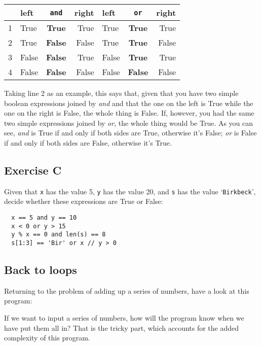 \vspace{1em}
\begin{tabular}{|l|lcr||lcr|}
\hline
& left & \verb!and! & right & left & \verb+or+ & right\\
\hline
\hline
1 & True & \textbf{True} & True&True&\textbf{True}&True\\
2 & True & \textbf{False} & False&True&\textbf{True}&False\\
3 & False & \textbf{False} & True&False&\textbf{True}&True\\
4 & False & \textbf{False} & False&False&\textbf{False}&False\\
\hline
\end{tabular}
\vspace{1em}

Taking line 2 as an example, this says that, given that you have two simple
boolean expressions joined by \emph{and} and that the one on the left is
True while the one on the right is False, the whole thing is False.  If,
however, you had the same two simple expressions joined by \emph{or}, the
whole thing would be True. As you can see, \emph{and} is True if and
only if both sides are True, otherwise it's False; \emph{or} is False
if and only if both sides are False, otherwise it's True.

\subsection*{Exercise C}

Given that \texttt{x} has the value 5, \texttt{y} has the value 20,
and \texttt{s} has the value `\texttt{Birkbeck}', decide whether these
expressions are True or False:

\begin{verbatim}
  x == 5 and y == 10
  x < 0 or y > 15
  y % x == 0 and len(s) == 8
  s[1:3] == 'Bir' or x // y > 0
\end{verbatim}


\subsection{Back to loops}

Returning to the problem of adding up a series of numbers, have a
look at this program:


If we want to input a series of numbers, how will the program know
when we have put them all in?  That is the tricky part, which accounts
for the added complexity of this program.

